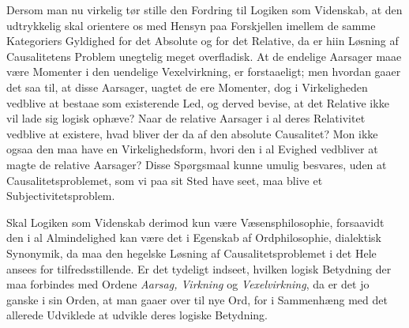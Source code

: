 \documentclass[11pt]{book}
\newcommand{\opage}[1]{\marginnote{\footnotesize\textit{[#1]}}}
\begin{document}
Dersom man nu virkelig tør stille den Fordring til Logiken som Videnskab,
at den udtrykkelig skal orientere os med Hensyn paa Forskjellen imellem de
samme Kategoriers Gyldighed for det Absolute og for det Relative, da er
hiin Løsning af Causalitetens Problem unegtelig meget overfladisk. At de
\opage{139} \setcounter{footnote}{0}%
endelige Aarsager maae være Momenter i den uendelige Vexelvirkning, er
forstaaeligt; men hvordan gaaer det saa til, at disse Aarsager, uagtet de
ere Momenter, dog i Virkeligheden vedblive at bestaae som existerende Led,
og derved bevise, at det Relative ikke vil lade sig logisk ophæve? Naar de
relative Aarsager i al deres Relativitet vedblive at existere, hvad bliver
der da af den absolute Causalitet? Mon ikke ogsaa den maa have en
Virkelighedsform, hvori den i al Evighed vedbliver at magte de relative
Aarsager? Disse Spørgsmaal kunne umulig besvares, uden at
Causalitetsproblemet, som vi paa sit Sted have seet, maa blive et
Subjectivitetsproblem.

Skal Logiken som Videnskab derimod kun være Væsensphilosophie, forsaavidt
den i al Almindelighed kan være det i Egenskab af Ordphilosophie,
dialektisk Synonymik, da maa den hegelske Løsning af Causalitetsproblemet
i det Hele ansees for tilfredsstillende. Er det tydeligt indseet, hvilken
logisk Betydning der maa forbindes med Ordene \emph{Aarsag, Virkning} og
\emph{Vexelvirkning}, da er det jo ganske i sin Orden, at man gaaer over
til nye Ord, for i Sammenhæng med det allerede Udviklede at udvikle deres
logiske Betydning.%
\end{document}
